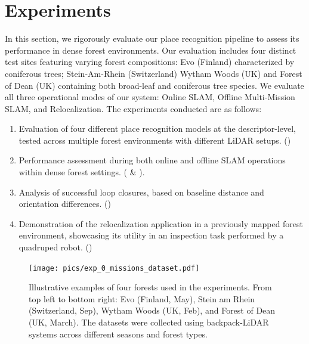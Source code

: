 \chapter{Experiments}
\label{chapter:experiments} 

In this section, we rigorously evaluate our place recognition pipeline to assess its performance in dense forest environments. Our evaluation includes four distinct test sites featuring varying forest compositions: Evo (Finland) characterized by coniferous trees; Stein-Am-Rhein (Switzerland) Wytham Woods (UK) and Forest of Dean (UK) containing both broad-leaf and coniferous tree species. We evaluate all three operational modes of our system: Online SLAM, Offline Multi-Mission SLAM, and Relocalization.
The experiments conducted are as follows:
\begin{enumerate}[label=\Roman*.]
  \item Evaluation of four different place recognition models at the descriptor-level, tested across multiple forest environments with different LiDAR setups. () 
  \item Performance assessment during both online and offline SLAM operations within dense forest settings. ( \& ).
  \item Analysis of successful loop closures, based on baseline distance and orientation differences. ()
  \item Demonstration of the relocalization application in a previously mapped forest environment, showcasing its utility in an inspection task performed by a quadruped robot. ()
\end{enumerate}

\begin{figure}[htbp]
  \centering
  \texttt{[image: pics/exp\_0\_missions\_dataset.pdf]}
  \caption{Illustrative examples of four forests used in the experiments. From top left to bottom right: Evo (Finland, May), Stein am Rhein (Switzerland, Sep), Wytham Woods (UK, Feb), and Forest of Dean (UK, March). The datasets were collected using backpack-LiDAR systems across different seasons and forest types.}
  \label{fig:missions_dataset}
\end{figure}


